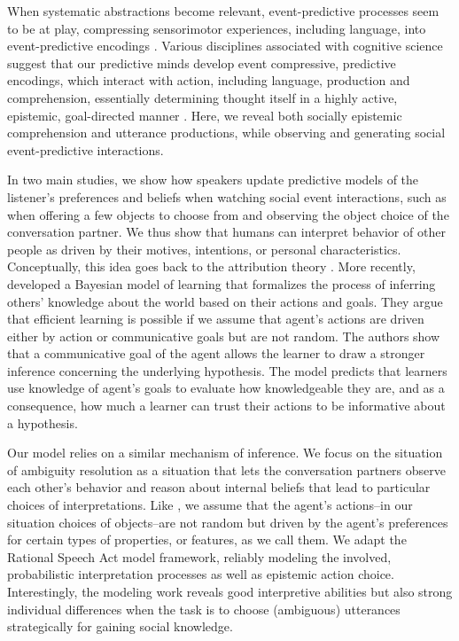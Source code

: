 \documentclass[10pt,a4paper]{article}
\begin{document}
When systematic abstractions become relevant, event-predictive processes seem to be at play, compressing sensorimotor experiences, including language, into event-predictive encodings \cite{Butz:2016,Butz:2017a}.
Various disciplines associated with cognitive science suggest that our predictive minds develop event compressive, predictive encodings, which interact with action, including language, production and comprehension, essentially determining thought itself in a highly active, epistemic, goal-directed manner  \cite{Baldwin:2019tsi,DuBrow:2019tsi,Elsner:2019tsi,Fallgatter:2019tsi,Knott:2019tsi,Papafragou:2019tsi,Zacks:2019tsi}.
Here, we reveal both socially epistemic comprehension and utterance productions, while observing and generating social event-predictive interactions.

In two main studies, we show how speakers update predictive models of the listener's preferences and beliefs when watching social event interactions, such as when offering a few objects to choose from and observing the object choice of the conversation partner. 
We thus show that humans can interpret behavior of other people as driven by their motives, intentions, or personal characteristics.
Conceptually, this idea goes back to the attribution theory \cite{jones1965acts, kelley1967attribution, kelley1970social}.
More recently,  developed a Bayesian model of learning that formalizes the process of inferring others' knowledge about the world based on their actions and goals. They argue that efficient learning is possible if we assume that agent's actions are driven either by action or communicative goals but are not random. The authors show that a communicative goal of the agent allows the learner to draw a stronger inference concerning the underlying hypothesis. The model predicts that learners use knowledge of agent's goals to evaluate how knowledgeable they are, and as a consequence, how much a learner can trust their actions to be informative about a hypothesis.
 
Our model relies on a similar mechanism of inference.
We focus on the situation of ambiguity resolution as a situation that lets the conversation partners observe each other's behavior and reason about internal beliefs that lead to particular choices of interpretations. Like , we assume that the agent's actions--in our situation choices of objects--are not random but driven by the agent's preferences for certain types of properties, or features, as we call them.
We adapt the Rational Speech Act model framework, reliably modeling the involved, probabilistic interpretation processes as well as epistemic action choice. 
Interestingly, the modeling work reveals good interpretive abilities but also strong individual differences when the task is to choose (ambiguous) utterances strategically for gaining social knowledge. 
\end{document}
